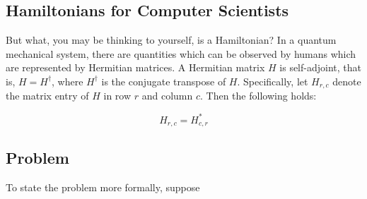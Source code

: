 \subsection{Hamiltonians for Computer Scientists}

But what, you may be thinking to yourself, is a Hamiltonian?
In a quantum mechanical system, there are quantities which can be observed
by humans which are represented by Hermitian matrices. A Hermitian matrix
$H$ is self-adjoint, that is, $H=H^\dagger$, where $H^\dagger$ is the
conjugate transpose of $H$. Specifically, let $H_{r,c}$ denote the matrix
entry of $H$ in row $r$ and column $c$. Then the following holds:

\begin{equation}
H_{r,c} = H^*_{c,r}
\end{equation}

\subsection{Problem}

To state the problem more formally, suppose 
